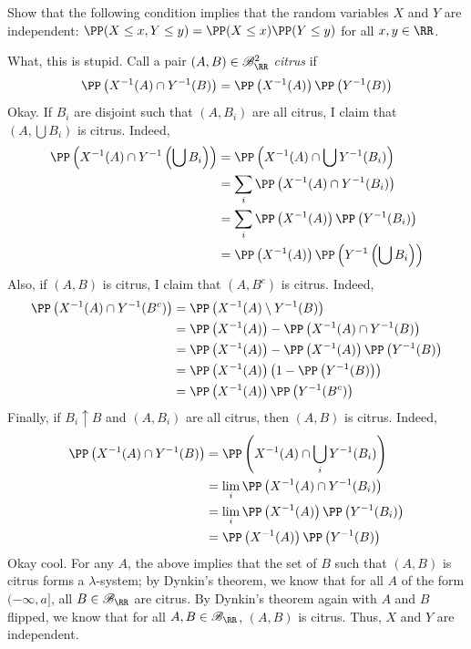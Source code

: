 \documentclass[11pt, headheight=30pt]{scrartcl}
\begin{document}
\begin{prob}
    Show that the following condition implies that the random variables $X$ and $Y$
    are independent: $\PP(X \leq x, Y\leq y) = \PP(X\leq x)\PP(Y\leq y)$
    for all $x, y \in \RR$.
\end{prob}
What, this is stupid. Call a pair $(A,B)\in \mathscr{B}_{\RR}^2$ \emph{citrus}
if
\[
    \PP\left(X^{-1}(A)\cap Y^{-1}(B)\right) = \PP\left(X^{-1}(A)\right)\PP\left(Y^{-1}(B)\right)
\]
Okay. If $B_i$ are disjoint such that $(A, B_i)$ are all citrus,
I claim that $(A, \bigcup B_i)$ is citrus. Indeed,
\begin{align*}
    \PP\left(X^{-1}(A)\cap Y^{-1}\left(\bigcup B_i\right)\right) &= \PP\left(X^{-1}(A)\cap \bigcup Y^{-1}(B_i)\right)\\
    &= \sum_i \PP\left(X^{-1}(A)\cap Y^{-1}(B_i)\right)\\
    &= \sum_i \PP\left(X^{-1}(A)\right)\PP\left(Y^{-1}(B_i)\right)\\
    &= \PP\left(X^{-1}(A)\right)\PP\left(Y^{-1}\left(\bigcup B_i\right)\right)
\end{align*}
Also, if $(A,B)$ is citrus, I claim that $(A, B^c)$ is citrus.
Indeed,
\begin{align*}
    \PP\left(X^{-1}(A)\cap Y^{-1}(B^c)\right) &= \PP\left(X^{-1}(A)\setminus Y^{-1}(B)\right)\\
    &= \PP\left(X^{-1}(A)\right) - \PP\left(X^{-1}(A)\cap Y^{-1}(B)\right)\\
    &= \PP\left(X^{-1}(A)\right) - \PP\left(X^{-1}(A)\right)\PP\left(Y^{-1}(B)\right)\\
    &= \PP\left(X^{-1}(A)\right)\left(1 - \PP\left(Y^{-1}(B)\right)\right)\\
    &= \PP\left(X^{-1}(A)\right)\PP\left(Y^{-1}(B^c)\right)
\end{align*}
Finally, if $B_i\uparrow B$
and $(A, B_i)$ are all citrus, then $(A, B)$ is citrus. Indeed,
\begin{align*}
    \PP\left(X^{-1}(A)\cap Y^{-1}(B)\right) &= \PP\left(X^{-1}(A)\cap \bigcup_i Y^{-1}(B_i)\right)\\
    &= \lim_i \PP\left(X^{-1}(A)\cap Y^{-1}(B_i)\right)\\
    &= \lim_i \PP\left(X^{-1}(A)\right)\PP\left(Y^{-1}(B_i)\right)\\
    &= \PP\left(X^{-1}(A)\right)\PP\left(Y^{-1}(B)\right)
\end{align*}
Okay cool. For any $A$, the above implies that the set of $B$
such that $(A,B)$ is citrus forms a $\lambda$-system; by Dynkin's
theorem, we know that for all $A$ of the form $(-\infty, a]$,
all $B\in \mathscr{B}_\RR$ are citrus. By Dynkin's theorem again with
$A$ and $B$ flipped, we know that for all $A, B \in \mathscr{B}_\RR$,
$(A,B)$ is citrus. Thus, $X$ and $Y$ are independent.
\end{document}
